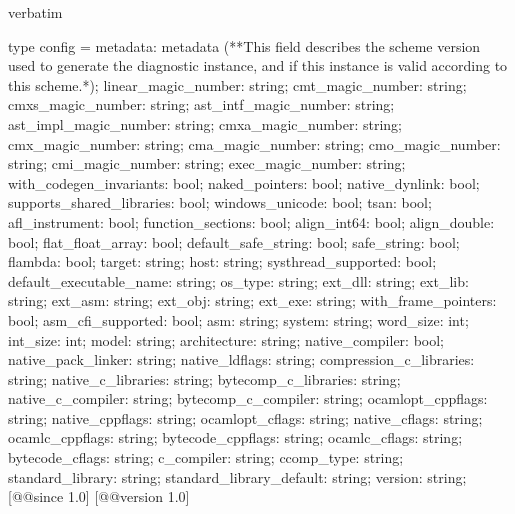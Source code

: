 \begin{camlexample}{verbatim}
\begin{caml}
\begin{camlinput}
type config = {
  metadata: metadata
    (**This field describes the scheme version used to generate the diagnostic instance, and if this instance is valid according to this scheme.*);
  linear_magic_number: string;
  cmt_magic_number: string;
  cmxs_magic_number: string;
  ast_intf_magic_number: string;
  ast_impl_magic_number: string;
  cmxa_magic_number: string;
  cmx_magic_number: string;
  cma_magic_number: string;
  cmo_magic_number: string;
  cmi_magic_number: string;
  exec_magic_number: string;
  with_codegen_invariants: bool;
  naked_pointers: bool;
  native_dynlink: bool;
  supports_shared_libraries: bool;
  windows_unicode: bool;
  tsan: bool;
  afl_instrument: bool;
  function_sections: bool;
  align_int64: bool;
  align_double: bool;
  flat_float_array: bool;
  default_safe_string: bool;
  safe_string: bool;
  flambda: bool;
  target: string;
  host: string;
  systhread_supported: bool;
  default_executable_name: string;
  os_type: string;
  ext_dll: string;
  ext_lib: string;
  ext_asm: string;
  ext_obj: string;
  ext_exe: string;
  with_frame_pointers: bool;
  asm_cfi_supported: bool;
  asm: string;
  system: string;
  word_size: int;
  int_size: int;
  model: string;
  architecture: string;
  native_compiler: bool;
  native_pack_linker: string;
  native_ldflags: string;
  compression_c_libraries: string;
  native_c_libraries: string;
  bytecomp_c_libraries: string;
  native_c_compiler: string;
  bytecomp_c_compiler: string;
  ocamlopt_cppflags: string;
  native_cppflags: string;
  ocamlopt_cflags: string;
  native_cflags: string;
  ocamlc_cppflags: string;
  bytecode_cppflags: string;
  ocamlc_cflags: string;
  bytecode_cflags: string;
  c_compiler: string;
  ccomp_type: string;
  standard_library: string;
  standard_library_default: string;
  version: string;
} [@@since 1.0]
[@@version 1.0]
\end{camlinput}
\end{caml}
\end{camlexample}
